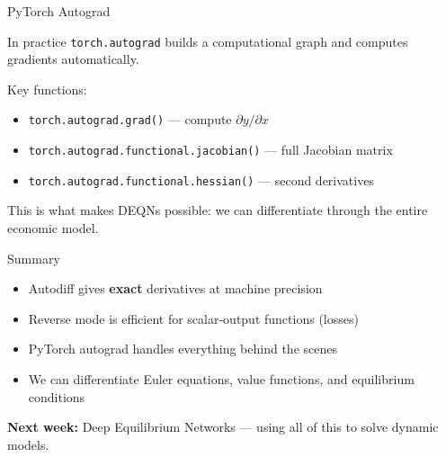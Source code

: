 \documentclass[aspectratio=169, 10pt]{beamer}
\begin{document}
\begin{frame}{PyTorch Autograd}
\begin{block}{In practice}
\texttt{torch.autograd} builds a computational graph and computes gradients automatically.
\end{block}

\bigskip
Key functions:
\begin{itemize}
\item \texttt{torch.autograd.grad()} --- compute $\partial y / \partial x$
\item \texttt{torch.autograd.functional.jacobian()} --- full Jacobian matrix
\item \texttt{torch.autograd.functional.hessian()} --- second derivatives
\end{itemize}

\bigskip
This is what makes DEQNs possible: we can differentiate through the entire economic model.
\end{frame}

\begin{frame}{Summary}
\begin{itemize}
\item Autodiff gives \textbf{exact} derivatives at machine precision
\item Reverse mode is efficient for scalar-output functions (losses)
\item PyTorch autograd handles everything behind the scenes
\item We can differentiate Euler equations, value functions, and equilibrium conditions
\end{itemize}

\bigskip
\textbf{Next week:} Deep Equilibrium Networks --- using all of this to solve dynamic models.
\end{frame}
\end{document}
